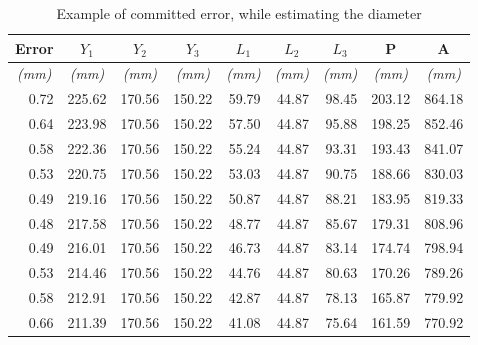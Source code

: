 \begin{table}[h!]
  \small
  \centering
  \begin{tabular}{|r|r|r|r|r|r|r|r|r|}
  \hline
  \multicolumn{1}{|c|}{\textbf{Error}} & \multicolumn{1}{c|}{\textbf{$Y_1$}} & \multicolumn{1}{c|}{\textbf{$Y_2$}} & \multicolumn{1}{c|}{\textbf{$Y_3$}} & \multicolumn{1}{c|}{\textbf{$L_1$}} & \multicolumn{1}{c|}{\textbf{$L_2$}} & \multicolumn{1}{c|}{\textbf{$L_3$}} & \multicolumn{1}{c|}{\textbf{P}} & \multicolumn{1}{c|}{\textbf{A}} \\ \hline
  \multicolumn{1}{|c|}{\textit{(mm)}}  & \multicolumn{1}{c|}{\textit{(mm)}}  & \multicolumn{1}{c|}{\textit{(mm)}}  & \multicolumn{1}{c|}{\textit{(mm)}}  & \multicolumn{1}{c|}{\textit{(mm)}}  & \multicolumn{1}{c|}{\textit{(mm)}}  & \multicolumn{1}{c|}{\textit{(mm)}}  & \multicolumn{1}{c|}{\textit{(mm)}}      & \multicolumn{1}{c|}{\textit{(mm)}} \\ \hline
  0.72	& 225.62	& 170.56	& 150.22	& 59.79	& 44.87	& 98.45	& 203.12	& 864.18	\\ \hline
  0.64	& 223.98	& 170.56	& 150.22	& 57.50	& 44.87	& 95.88	& 198.25	& 852.46	\\ \hline
  0.58	& 222.36	& 170.56	& 150.22	& 55.24	& 44.87	& 93.31	& 193.43	& 841.07	\\ \hline
  0.53	& 220.75	& 170.56	& 150.22	& 53.03	& 44.87	& 90.75	& 188.66	& 830.03	\\ \hline
  0.49	& 219.16	& 170.56	& 150.22	& 50.87	& 44.87	& 88.21	& 183.95	& 819.33	\\ \hline
  0.48	& 217.58	& 170.56	& 150.22	& 48.77	& 44.87	& 85.67	& 179.31	& 808.96	\\ \hline
  0.49	& 216.01	& 170.56	& 150.22	& 46.73	& 44.87	& 83.14	& 174.74	& 798.94	\\ \hline
  0.53	& 214.46	& 170.56	& 150.22	& 44.76	& 44.87	& 80.63	& 170.26	& 789.26	\\ \hline
  0.58	& 212.91	& 170.56	& 150.22	& 42.87	& 44.87	& 78.13	& 165.87	& 779.92	\\ \hline
  0.66	& 211.39	& 170.56	& 150.22	& 41.08	& 44.87	& 75.64	& 161.59	& 770.92	\\ \hline
  \end{tabular}
  \caption{Example of committed error, while estimating the diameter}
  \label{tab:diam:tab1}
\end{table}
